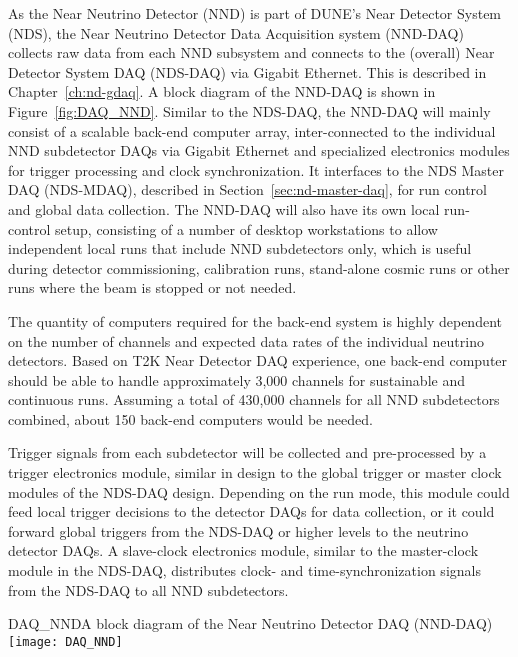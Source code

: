 
As the Near Neutrino Detector (NND) is part of DUNE's Near Detector System (NDS), the Near Neutrino Detector Data Acquisition system (NND-DAQ) collects raw data from 
each %
NND subsystem and connects to the (overall) Near 
Detector System DAQ (NDS-DAQ) via Gigabit Ethernet. This is described in 
Chapter~\ref{ch:nd-gdaq}. A block diagram of the NND-DAQ is
shown in Figure~\ref{fig:DAQ_NND}.
Similar to the NDS-DAQ, the NND-DAQ will mainly consist 
of a scalable back-end computer array, inter-connected to the individual NND 
subdetector DAQs via Gigabit Ethernet and specialized electronics modules for trigger 
processing and clock synchronization. It interfaces to the NDS Master DAQ (NDS-MDAQ),
described in Section~\ref{sec:nd-master-daq}, for 
run control and global  data collection. The NND-DAQ will also have its own local run-control setup, 
consisting of a number of desktop workstations to allow independent local runs that include 
NND subdetectors only, which is useful during detector commissioning, calibration runs, 
stand-alone cosmic runs or other runs where the beam is stopped or not needed.

The quantity of computers required for the back-end system is highly dependent on the 
number of channels and expected data rates of the individual neutrino detectors. Based on 
T2K Near Detector DAQ experience, one back-end computer should be able to handle 
approximately 3,000 channels for sustainable and continuous runs. Assuming a total of 
430,000 channels for all NND subdetectors combined, about 150 back-end computers would be 
needed.

Trigger signals from each subdetector will be collected and pre-processed by a 
trigger electronics module, similar in design to the global   trigger or master clock modules 
of the NDS-DAQ design. Depending on the run mode, this module could feed local trigger 
decisions to the detector DAQs for data collection, or it could forward global   triggers 
from the NDS-DAQ or higher levels to the neutrino detector DAQs.  A slave-clock electronics 
module, similar to the master-clock module in the NDS-DAQ, distributes clock- and 
time-synchronization signals from the NDS-DAQ to all NND subdetectors.


\begin{cdrfigure}{DAQ_NND}{A block diagram of the Near Neutrino Detector DAQ (NND-DAQ)}
\texttt{[image: DAQ\_NND]}
\end{cdrfigure}


